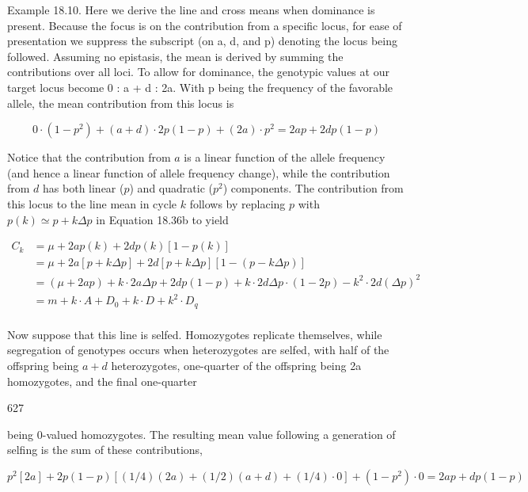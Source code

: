 \documentclass{article}
\begin{document}
Example 18.10. Here we derive the line and cross means when dominance is present. Because the focus is on the contribution from a specific locus, for ease of presentation we suppress the subscript (on a, d, and p) denoting the locus being followed. Assuming no epistasis, the mean is derived by summing the contributions over all loci. To allow for dominance, the genotypic values at our target locus become 0 : a + d : 2a. With p being the frequency of the favorable allele, the mean contribution from this locus is

\begin{equation}
0\cdot(1-p^{2})+(a+d)\cdot2p(1-p)+(2a)\cdot p^{2}=2ap+2dp(1-p)
\end{equation}

Notice that the contribution from $a$ is a linear function of the allele frequency (and hence a linear function of allele frequency change), while the contribution from $d$ has both linear ($p$) and quadratic ($p^2$) components. The contribution from this locus to the line mean in cycle $k$ follows by replacing $p$ with $p(k) \simeq p + k \Delta p$ in Equation 18.36b to yield

\begin{equation}
\begin{aligned}C_{k}&=\mu+2ap(k)+2dp(k)[1-p(k)]\\&=\mu+2a[p+k\Delta p]+2d[p+k\Delta p][1-(p-k\Delta p)]\\&=\left(\mu+2ap\right)+k\cdot2a\Delta p+2dp(1-p)+k\cdot2d\Delta p\cdot(1-2p)-k^{2}\cdot2d\left(\Delta p\right)^{2}\\&=m+k\cdot A+D_{0}+k\cdot D+k^{2}\cdot D_{q}\\ \end{aligned}
\end{equation}

Now suppose that this line is selfed. Homozygotes replicate themselves, while segregation of genotypes occurs when heterozygotes are selfed, with half of the offspring being  $ a + d $ heterozygotes, one-quarter of the offspring being 2a homozygotes, and the final one-quarter

627

being 0-valued homozygotes. The resulting mean value following a generation of selfing is the sum of these contributions,

\begin{equation}
p^{2}\left[2a\right]+2p(1-p)\left[(1/4)(2a)+(1/2)(a+d)+(1/4)\cdot0\right]+(1-p^{2})\cdot0=2ap+dp(1-p)
\end{equation}
\end{document}
